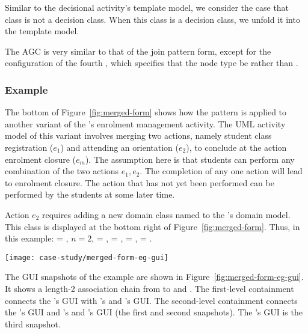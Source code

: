Similar to the decisional activity's template model, we consider the case that class  is not a decision class. When this class is a decision class, we unfold it into the template model.

The AGC is very similar to that of the join pattern form, except for the configuration of the fourth , which specifies that the node type be  rather than .
%
\subsubsection*{Example}
The bottom of Figure~\ref{fig:merged-form} shows how the pattern is applied to another variant of the \courseman's enrolment management activity. The UML activity model of this variant involves merging two actions, namely student class registration ($e_1$) and attending an orientation ($e_2$), to conclude at the action enrolment closure ($e_m$). The assumption here is that students can perform any combination of the two actions $e_1, e_2$. The completion of any one action will lead to enrolment closure. The action that has not yet been performed can be performed by the students at some later time.

Action $e_2$ requires adding a new domain class named  to the 's domain model. This class is displayed at the bottom right of Figure~\ref{fig:merged-form}. Thus, in this example:  = , $ n = 2 $,  = ,  = ,  = ,  = . 

\begin{figure*}%
	\begin{center}
		\texttt{[image: case-study/merged-form-eg-gui]}
	\end{center}
	\caption{The merged pattern form view of enrolment management activity.} %
	\label{fig:merged-form-eg-gui}
\end{figure*}

The GUI snapshots of the example are shown in Figure~\ref{fig:merged-form-eg-gui}. It shows a length-2 association chain from  to  and . 
The first-level containment connects the 's GUI with 's and 's GUI. The second-level containment connects the 's GUI and 's and 's GUI (the first and second snapshots). The 's GUI is the third snapshot.
